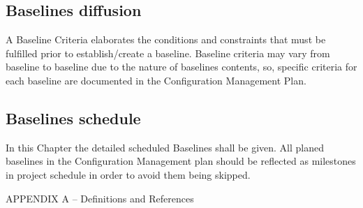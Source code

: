 \documentclass{template/openetcs_article}
\begin{document}
\subsection{Baselines diffusion} %
A Baseline Criteria elaborates the conditions and constraints that must be fulfilled prior to establish/create a baseline. Baseline criteria may vary from baseline to baseline due to the nature of baselines contents, so, specific criteria for each baseline are documented in the Configuration Management Plan.

\subsection{Baselines schedule} %
In this Chapter the detailed scheduled Baselines shall be given. All planed baselines in the Configuration Management plan should be reflected as milestones in project schedule in order to avoid them being skipped.







APPENDIX
A –	Definitions and References









\end{document}
